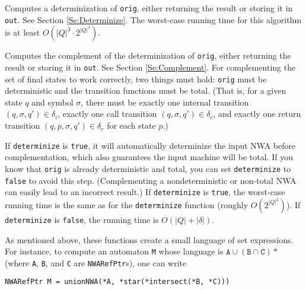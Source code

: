 \begin{functionlist}
    Computes a determinization of \texttt{orig}, either returning the
    result or storing it in \texttt{out}.
    See Section \ref{Se:Determinize}. The worst-case running time for this
    algorithm is at least $O({|Q|^3} \cdot2^{|Q|^2})$.

    Computes the complement of the determinization of \texttt{orig},
    either returning the result or storing it in \texttt{out}.
    See Section
    \ref{Se:Complement}. For complementing the set of final states to work
    correctly, two things must hold: \texttt{orig} must be deterministic and
    the transition functions must be total. (That is, for a given state $q$
    and symbol $\sigma$, there must be exactly one internal transition $(q,
    \sigma, q') \in\delta_i$, exactly one call transition $(q, \sigma,
    q')\in\delta_c$, and exactly one return transition $(q, p, \sigma,
    q')\in\delta_r$ for each state $p$.)

    \vspace{0.5\baselineskip}
    If \texttt{determinize} is \texttt{true}, it will
    automatically determinize the input NWA before complementation, which
    also guarantees the input machine will be total. If you
    know that \texttt{orig} is already deterministic and total, you can set
    \texttt{determinize} to
    \texttt{false} to avoid this step. (Complementing a nondeterministic or
    non-total NWA can easily lead to an incorrect result.) If
    \texttt{determinize} is \texttt{true}, the worst-case running time is the
    same as for the \texttt{determinize} function (roughly
    $O(2^{|Q|^2})$). If \texttt{determinize} is \texttt{false}, the running
    time is $O(|Q|+|\delta|)$.

\end{functionlist}

As mentioned above, these functions create a small language of set
expressions. For instance, to compute an automaton \texttt{M} whose language
is $\texttt{A} \cup (\texttt{B} \cap \texttt{C})*$ (where \texttt{A},
\texttt{B}, and \texttt{C} are \texttt{NWARefPtr}s), one can write
\begin{center}
  \texttt{NWARefPtr M = unionNWA(*A, *star(*intersect(*B, *C)))}
\end{center}


